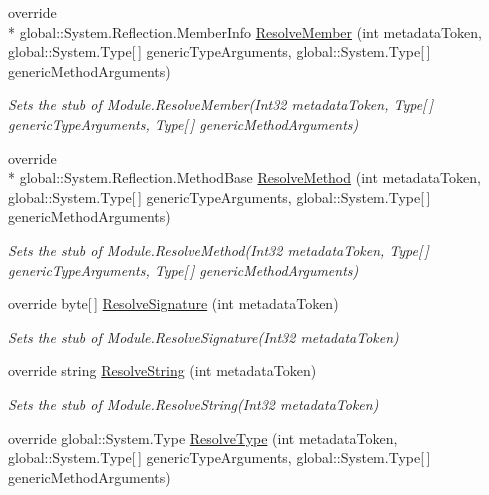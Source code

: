 \begin{DoxyCompactItemize}
override \\*
global\-::\-System.\-Reflection.\-Member\-Info \hyperlink{class_system_1_1_reflection_1_1_fakes_1_1_stub_module_a79dcfdd3e0f1f5059c91d5256c9ce641}{Resolve\-Member} (int metadata\-Token, global\-::\-System.\-Type\mbox{[}$\,$\mbox{]} generic\-Type\-Arguments, global\-::\-System.\-Type\mbox{[}$\,$\mbox{]} generic\-Method\-Arguments)
\begin{DoxyCompactList}\small\item\em Sets the stub of Module.\-Resolve\-Member(\-Int32 metadata\-Token, Type\mbox{[}$\,$\mbox{]} generic\-Type\-Arguments, Type\mbox{[}$\,$\mbox{]} generic\-Method\-Arguments)\end{DoxyCompactList}\item 
override \\*
global\-::\-System.\-Reflection.\-Method\-Base \hyperlink{class_system_1_1_reflection_1_1_fakes_1_1_stub_module_a0bd726e52926ce1a4f9843d10795dfae}{Resolve\-Method} (int metadata\-Token, global\-::\-System.\-Type\mbox{[}$\,$\mbox{]} generic\-Type\-Arguments, global\-::\-System.\-Type\mbox{[}$\,$\mbox{]} generic\-Method\-Arguments)
\begin{DoxyCompactList}\small\item\em Sets the stub of Module.\-Resolve\-Method(\-Int32 metadata\-Token, Type\mbox{[}$\,$\mbox{]} generic\-Type\-Arguments, Type\mbox{[}$\,$\mbox{]} generic\-Method\-Arguments)\end{DoxyCompactList}\item 
override byte\mbox{[}$\,$\mbox{]} \hyperlink{class_system_1_1_reflection_1_1_fakes_1_1_stub_module_acc8c241f2e615b24c037487761bc7dee}{Resolve\-Signature} (int metadata\-Token)
\begin{DoxyCompactList}\small\item\em Sets the stub of Module.\-Resolve\-Signature(\-Int32 metadata\-Token)\end{DoxyCompactList}\item 
override string \hyperlink{class_system_1_1_reflection_1_1_fakes_1_1_stub_module_a484f851e4592bb26620594a3a73c9353}{Resolve\-String} (int metadata\-Token)
\begin{DoxyCompactList}\small\item\em Sets the stub of Module.\-Resolve\-String(\-Int32 metadata\-Token)\end{DoxyCompactList}\item 
override global\-::\-System.\-Type \hyperlink{class_system_1_1_reflection_1_1_fakes_1_1_stub_module_a728478c7e203d97456cab1699118f445}{Resolve\-Type} (int metadata\-Token, global\-::\-System.\-Type\mbox{[}$\,$\mbox{]} generic\-Type\-Arguments, global\-::\-System.\-Type\mbox{[}$\,$\mbox{]} generic\-Method\-Arguments)

\end{DoxyCompactItemize}
